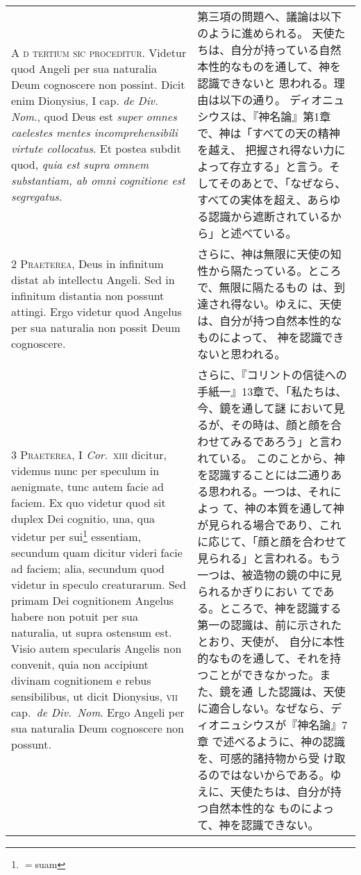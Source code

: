 \documentclass[10pt]{jsarticle} %
\begin{document}
\begin{longtable}{p{21em}p{21em}}

{\huge A}{\scshape 
d tertium sic proceditur}. Videtur quod
Angeli per sua naturalia Deum cognoscere non possint. Dicit enim
Dionysius, I cap. {\itshape de Div. Nom}., quod Deus est {\itshape super omnes caelestes
mentes incomprehensibili virtute collocatus}. Et postea subdit quod, {\itshape quia
est supra omnem substantiam, ab omni cognitione est segregatus}.


&


第三項の問題へ、議論は以下のように進められる。
天使たちは、自分が持っている自然本性的なものを通して、神を認識できないと
 思われる。理由は以下の通り。
ディオニュシウスは、『神名論』第1章で、神は「すべての天の精神を越え、
 把握され得ない力によって存立する」と言う。そしてそのあとで、「なぜなら、
 すべての実体を超え、あらゆる認識から遮断されているから」と述べている。

\\



{\scshape 2 Praeterea}, Deus in infinitum distat ab
intellectu Angeli. Sed in infinitum distantia non possunt attingi. Ergo
videtur quod Angelus per sua naturalia non possit Deum cognoscere.


&

さらに、神は無限に天使の知性から隔たっている。ところで、無限に隔たるもの
 は、到達され得ない。ゆえに、天使は、自分が持つ自然本性的なものによって、
 神を認識できないと思われる。

\\


{\scshape 3 Praeterea}, I {\itshape Cor}.~{\scshape xiii} dicitur, videmus
nunc per speculum in aenigmate, tunc autem facie ad faciem. Ex quo
videtur quod sit duplex Dei cognitio, una, qua videtur per sui\footnote{$=$suam}
essentiam, secundum quam dicitur videri facie ad faciem; alia, secundum
quod videtur in speculo creaturarum. Sed primam Dei cognitionem Angelus
habere non potuit per sua naturalia, ut supra ostensum est. Visio autem
specularis Angelis non convenit, quia non accipiunt divinam cognitionem
e rebus sensibilibus, ut dicit Dionysius, {\scshape vii} cap.~{\itshape de Div.~Nom}. Ergo
Angeli per sua naturalia Deum cognoscere non possunt.


&

さらに、『コリントの信徒への手紙一』13章で、「私たちは、今、鏡を通して謎
 において見るが、その時は、顔と顔を合わせてみるであろう」と言われている。
 このことから、神を認識することには二通りある思われる。一つは、それによっ
 て、神の本質を通して神が見られる場合であり、これに応じて、「顔と顔を合わせて
 見られる」と言われる。もう一つは、被造物の鏡の中に見られるかぎりにおい
 てである。ところで、神を認識する第一の認識は、前に示されたとおり、天使が、
 自分に本性的なものを通して、それを持つことができなかった。また、鏡を通
 した認識は、天使に適合しない。なぜなら、ディオニュシウスが『神名論』7章
 で述べるように、神の認識を、可感的諸持物から受
 け取るのではないからである。ゆえに、天使たちは、自分が持つ自然本性的な
 ものによって、神を認識できない。



\end{longtable}
\end{document}
